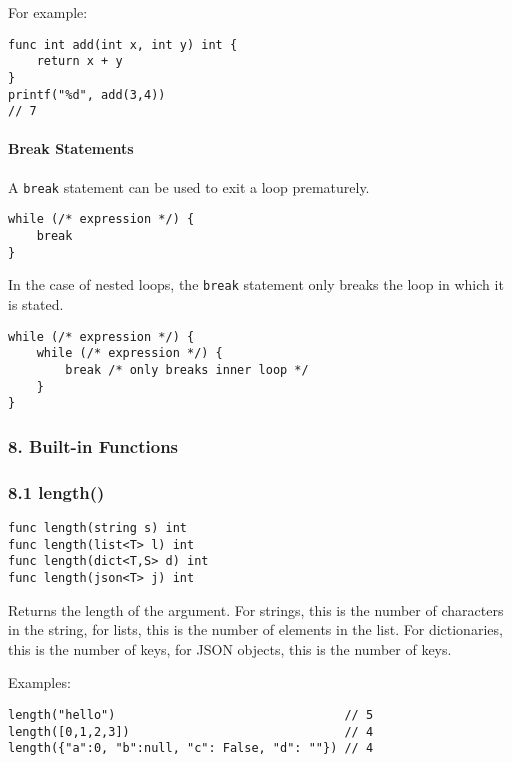 For example:

\begin{verbatim}
func int add(int x, int y) int {
    return x + y
}
printf("%d", add(3,4))
// 7
\end{verbatim}

\paragraph{Break Statements}\label{break-statements}

A \texttt{break} statement can be used to exit a loop prematurely.

\begin{verbatim}
while (/* expression */) {
    break
}
\end{verbatim}

In the case of nested loops, the \texttt{break} statement only breaks
the loop in which it is stated.

\begin{verbatim}
while (/* expression */) {
    while (/* expression */) {
        break /* only breaks inner loop */
    }
}
\end{verbatim}

\subsubsection{8. Built-in Functions}\label{built-in-functions}

\subsubsection{8.1 length()}\label{length}

\begin{verbatim}
func length(string s) int
func length(list<T> l) int
func length(dict<T,S> d) int
func length(json<T> j) int
\end{verbatim}

Returns the length of the argument. For strings, this is the number of
characters in the string, for lists, this is the number of elements in
the list. For dictionaries, this is the number of keys, for JSON
objects, this is the number of keys.

Examples:

\begin{verbatim}
length("hello")                                // 5
length([0,1,2,3])                              // 4
length({"a":0, "b":null, "c": False, "d": ""}) // 4
\end{verbatim}

